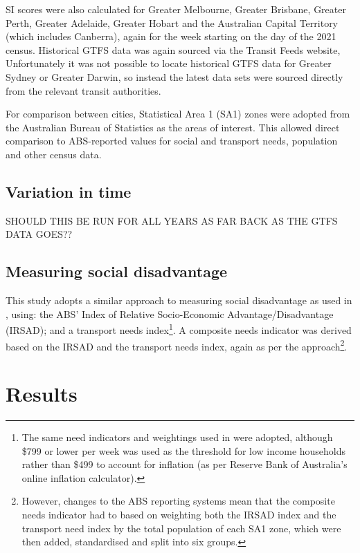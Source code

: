 \documentclass[preprint, 3p,
authoryear]{elsarticle} %
\begin{document}
SI scores were also calculated for Greater Melbourne, Greater Brisbane,
Greater Perth, Greater Adelaide, Greater Hobart and the Australian
Capital Territory (which includes Canberra), again for the week starting
on the day of the 2021 census. Historical GTFS data was again sourced
via the Transit Feeds website, Unfortunately it was not possible to
locate historical GTFS data for Greater Sydney or Greater Darwin, so
instead the latest data sets were sourced directly from the relevant
transit authorities.

For comparison between cities, Statistical Area 1 (SA1) zones were
adopted from the Australian Bureau of Statistics \citep{ABSmaps} as the
areas of interest. This allowed direct comparison to ABS-reported values
for social and transport needs, population and other census data.

\subsection{Variation in time}\label{variation-in-time}

SHOULD THIS BE RUN FOR ALL YEARS AS FAR BACK AS THE GTFS DATA GOES??

\subsection{Measuring social
disadvantage}\label{measuring-social-disadvantage}

This study adopts a similar approach to measuring social disadvantage as
used in \citet{currie2010identifying}, using: the ABS' Index of Relative
Socio-Economic Advantage/Disadvantage (IRSAD); and a transport needs
index\footnote{The same need indicators and weightings used in
  \citet{currie2010identifying} were adopted, although \$799 or lower
  per week was used as the threshold for low income households rather
  than \$499 to account for inflation (as per Reserve Bank of
  Australia's online inflation calculator).}. A composite needs
indicator was derived based on the IRSAD and the transport needs index,
again as per the \citet{currie2010identifying} approach\footnote{However,
  changes to the ABS reporting systems mean that the composite needs
  indicator had to based on weighting both the IRSAD index and the
  transport need index by the total population of each SA1 zone, which
  were then added, standardised and split into six groups.}.

\section{Results}\label{results}
\end{document}
